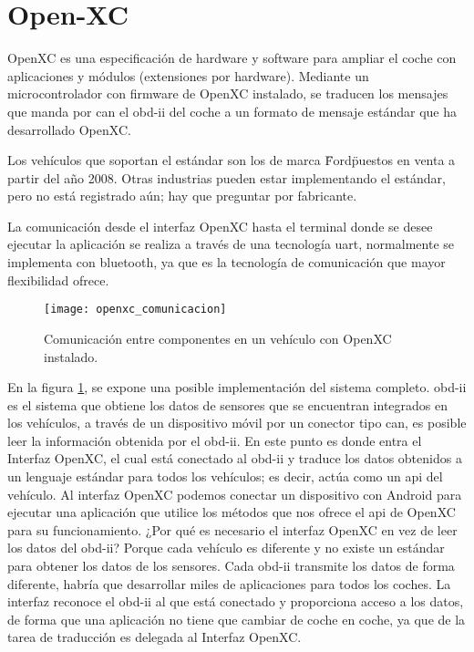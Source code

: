 \section{Open-XC}\label{apendice:open-xc}
OpenXC es una especificación de hardware y software para ampliar el coche con
aplicaciones y módulos (extensiones por hardware). Mediante un microcontrolador
con firmware de OpenXC instalado, se traducen los mensajes que manda por
\gls{can} el \Gls{obd-ii} del coche a un formato de mensaje estándar que ha
desarrollado OpenXC.

Los vehículos que soportan el estándar son los de marca \"Ford\" puestos
en venta a partir del año 2008. Otras industrias pueden estar implementando el
estándar, pero no está registrado aún; hay que preguntar por fabricante.

La comunicación desde el interfaz OpenXC hasta el terminal donde se desee
ejecutar la aplicación se realiza a través de una tecnología \gls{uart},
normalmente se implementa con bluetooth, ya que es la tecnología de comunicación
que mayor flexibilidad ofrece.

\begin{figure}[H]
	\begin{center}
		\texttt{[image: openxc\_comunicacion]}
		\caption{Comunicación entre componentes en un vehículo con OpenXC instalado.}
		\label{fig:openxc_comunicacion}
	\end{center}
\end{figure}


En la figura \ref{fig:openxc_comunicacion}, se expone una posible
implementación del sistema completo. \Gls{obd-ii} es el sistema que obtiene los
datos de sensores que se encuentran integrados en los vehículos, a través de un
dispositivo móvil por un conector tipo \gls{can}, es posible leer la información
obtenida por el \Gls{obd-ii}. En este punto es donde entra el Interfaz OpenXC,
el cual está conectado al \Gls{obd-ii} y traduce los datos obtenidos a un
lenguaje estándar para todos los vehículos; es decir, actúa como un \gls{api}
del vehículo. Al interfaz OpenXC podemos conectar un dispositivo con Android
para ejecutar una aplicación que utilice los métodos que nos ofrece el \gls{api}
de OpenXC para su funcionamiento. ¿Por qué es necesario el interfaz OpenXC en
vez de leer los datos del \Gls{obd-ii}? Porque cada vehículo es diferente y no
existe un estándar para obtener los datos de los sensores. Cada \Gls{obd-ii}
transmite los datos de forma diferente, habría que desarrollar miles de
aplicaciones para todos los coches. La interfaz reconoce el \Gls{obd-ii} al que
está conectado y proporciona acceso a los datos, de forma que una aplicación no
tiene que cambiar de coche en coche, ya que de la tarea de traducción es
delegada al Interfaz OpenXC.

